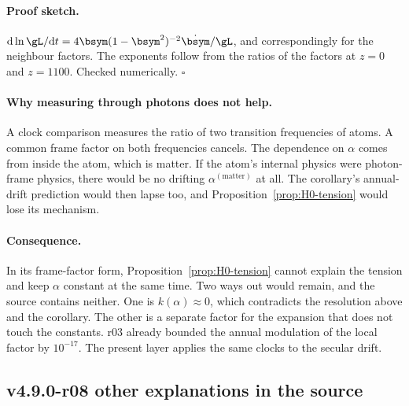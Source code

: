 \paragraph{Proof sketch.}
\({\rm d}\ln\gL/{\rm d}t=4\bsym(1-\bsym^2)^{-2}\dot\bsym/\gL\), and correspondingly for the neighbour factors.  The
exponents follow from the ratios of the factors at \(z=0\) and \(z=1100\).  Checked numerically.  \(\square\)

\paragraph{Why measuring through photons does not help.}
A clock comparison measures the ratio of two transition frequencies of atoms.  A common frame factor on both frequencies
cancels.  The dependence on \(\alpha\) comes from inside the atom, which is matter.  If the atom's internal physics were
photon-frame physics, there would be no drifting \(\alpha^{(\mathrm{matter})}\) at all.  The corollary's annual-drift
prediction would then lapse too, and Proposition~\ref{prop:H0-tension} would lose its mechanism.

\paragraph{Consequence.}
In its frame-factor form, Proposition~\ref{prop:H0-tension} cannot explain the tension and keep \(\alpha\) constant at the
same time.  Two ways out would remain, and the source contains neither.  One is \(k(\alpha)\approx0\), which contradicts the
resolution above and the corollary.  The other is a separate factor for the expansion that does not touch the
constants.  r03 already bounded the annual modulation of the local factor by \(10^{-17}\).  The present layer applies the
same clocks to the secular drift.

\subsection*{v4.9.0-r08 other explanations in the source}
\label{subsec:v490-r08-other}

